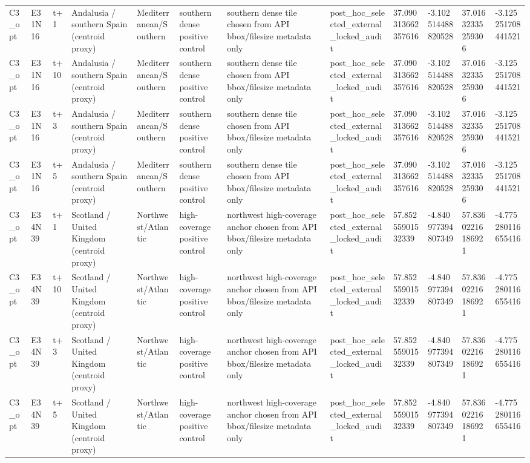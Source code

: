 \begin{landscape}
\begin{longtable}{llllllllllll}
C3\_opt & E31N16 & t+1 & Andalusia / southern Spain (centroid proxy) & Mediterranean/Southern & southern dense positive control & southern dense tile chosen from API bbox/filesize metadata only & post\_hoc\_selected\_external\_locked\_audit & 37.090313662357616 & -3.102514488820528 & 37.01632335259306 & -3.125251708441521 \\
C3\_opt & E31N16 & t+10 & Andalusia / southern Spain (centroid proxy) & Mediterranean/Southern & southern dense positive control & southern dense tile chosen from API bbox/filesize metadata only & post\_hoc\_selected\_external\_locked\_audit & 37.090313662357616 & -3.102514488820528 & 37.01632335259306 & -3.125251708441521 \\
C3\_opt & E31N16 & t+3 & Andalusia / southern Spain (centroid proxy) & Mediterranean/Southern & southern dense positive control & southern dense tile chosen from API bbox/filesize metadata only & post\_hoc\_selected\_external\_locked\_audit & 37.090313662357616 & -3.102514488820528 & 37.01632335259306 & -3.125251708441521 \\
C3\_opt & E31N16 & t+5 & Andalusia / southern Spain (centroid proxy) & Mediterranean/Southern & southern dense positive control & southern dense tile chosen from API bbox/filesize metadata only & post\_hoc\_selected\_external\_locked\_audit & 37.090313662357616 & -3.102514488820528 & 37.01632335259306 & -3.125251708441521 \\
C3\_opt & E34N39 & t+1 & Scotland / United Kingdom (centroid proxy) & Northwest/Atlantic & high-coverage positive control & northwest high-coverage anchor chosen from API bbox/filesize metadata only & post\_hoc\_selected\_external\_locked\_audit & 57.85255901532339 & -4.840977394807349 & 57.83602216186921 & -4.775280116655416 \\
C3\_opt & E34N39 & t+10 & Scotland / United Kingdom (centroid proxy) & Northwest/Atlantic & high-coverage positive control & northwest high-coverage anchor chosen from API bbox/filesize metadata only & post\_hoc\_selected\_external\_locked\_audit & 57.85255901532339 & -4.840977394807349 & 57.83602216186921 & -4.775280116655416 \\
C3\_opt & E34N39 & t+3 & Scotland / United Kingdom (centroid proxy) & Northwest/Atlantic & high-coverage positive control & northwest high-coverage anchor chosen from API bbox/filesize metadata only & post\_hoc\_selected\_external\_locked\_audit & 57.85255901532339 & -4.840977394807349 & 57.83602216186921 & -4.775280116655416 \\
C3\_opt & E34N39 & t+5 & Scotland / United Kingdom (centroid proxy) & Northwest/Atlantic & high-coverage positive control & northwest high-coverage anchor chosen from API bbox/filesize metadata only & post\_hoc\_selected\_external\_locked\_audit & 57.85255901532339 & -4.840977394807349 & 57.83602216186921 & -4.775280116655416 \\

\end{longtable}
\end{landscape}

